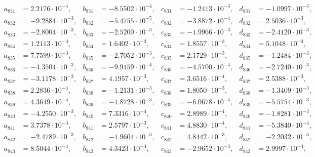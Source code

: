 \begin{align*}
  a_{ 831 } &= 2.2176 \cdot 10^{ -4 }, & b_{ 831 } &= -8.5502 \cdot 10^{ -4 }, & c_{ 831 } &= -1.2413 \cdot 10^{ -3 }, & d_{ 831 } &= -1.0997 \cdot 10^{ -3 }, \\ 
  a_{ 832 } &= -9.2884 \cdot 10^{ -3 }, & b_{ 832 } &= -5.4755 \cdot 10^{ -5 }, & c_{ 832 } &= -3.8872 \cdot 10^{ -4 }, & d_{ 832 } &= 2.5036 \cdot 10^{ -3 }, \\ 
  a_{ 833 } &= -2.8004 \cdot 10^{ -3 }, & b_{ 833 } &= -2.5200 \cdot 10^{ -3 }, & c_{ 833 } &= -1.9966 \cdot 10^{ -3 }, & d_{ 833 } &= -2.4120 \cdot 10^{ -3 }, \\ 
  a_{ 834 } &= 1.2113 \cdot 10^{ -3 }, & b_{ 834 } &= 1.6402 \cdot 10^{ -3 }, & c_{ 834 } &= 1.8557 \cdot 10^{ -3 }, & d_{ 834 } &= 5.1048 \cdot 10^{ -3 }, \\ 
  a_{ 835 } &= 7.7599 \cdot 10^{ -3 }, & b_{ 835 } &= -2.7052 \cdot 10^{ -3 }, & c_{ 835 } &= 2.1729 \cdot 10^{ -3 }, & d_{ 835 } &= -1.2484 \cdot 10^{ -3 }, \\ 
  a_{ 836 } &= -4.3504 \cdot 10^{ -3 }, & b_{ 836 } &= -9.9159 \cdot 10^{ -4 }, & c_{ 836 } &= -4.5700 \cdot 10^{ -4 }, & d_{ 836 } &= -2.7240 \cdot 10^{ -3 }, \\ 
  a_{ 837 } &= -3.1178 \cdot 10^{ -3 }, & b_{ 837 } &= 4.1957 \cdot 10^{ -3 }, & c_{ 837 } &= 3.6516 \cdot 10^{ -4 }, & d_{ 837 } &= 2.5388 \cdot 10^{ -3 }, \\ 
  a_{ 838 } &= 2.2836 \cdot 10^{ -4 }, & b_{ 838 } &= -1.2131 \cdot 10^{ -3 }, & c_{ 838 } &= 1.8050 \cdot 10^{ -3 }, & d_{ 838 } &= -1.3409 \cdot 10^{ -3 }, \\ 
  a_{ 839 } &= 4.3649 \cdot 10^{ -4 }, & b_{ 839 } &= -1.8728 \cdot 10^{ -3 }, & c_{ 839 } &= -6.0678 \cdot 10^{ -4 }, & d_{ 839 } &= -5.5754 \cdot 10^{ -3 }, \\ 
  a_{ 840 } &= -4.2550 \cdot 10^{ -3 }, & b_{ 840 } &= 7.3316 \cdot 10^{ -4 }, & c_{ 840 } &= 2.8989 \cdot 10^{ -4 }, & d_{ 840 } &= -1.8281 \cdot 10^{ -3 }, \\ 
  a_{ 841 } &= 3.7378 \cdot 10^{ -3 }, & b_{ 841 } &= 2.5797 \cdot 10^{ -3 }, & c_{ 841 } &= 4.8830 \cdot 10^{ -4 }, & d_{ 841 } &= -5.3840 \cdot 10^{ -4 }, \\ 
  a_{ 842 } &= -2.4789 \cdot 10^{ -3 }, & b_{ 842 } &= -1.9604 \cdot 10^{ -3 }, & c_{ 842 } &= 4.8442 \cdot 10^{ -3 }, & d_{ 842 } &= -2.2032 \cdot 10^{ -3 }, \\ 
  a_{ 843 } &= 8.5044 \cdot 10^{ -4 }, & b_{ 843 } &= 4.3423 \cdot 10^{ -4 }, & c_{ 843 } &= -2.9652 \cdot 10^{ -3 }, & d_{ 843 } &= 2.9997 \cdot 10^{ -4 }, \\ 

\end{align*}
